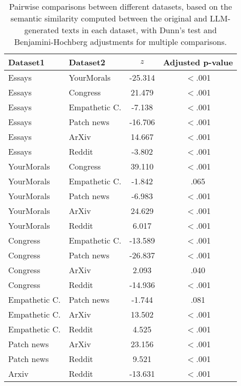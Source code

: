 \begin{table*}[h]
\caption{Pairwise comparisons between different datasets, based on the semantic similarity computed between the original and LLM-generated texts in each dataset, with Dunn's test and Benjamini-Hochberg adjustments for multiple comparisons.}
\centering
\begin{tabular}{llcc}
\toprule
Dataset1 & Dataset2 & $z$ & Adjusted p-value\\
\hline
Essays & YourMorals & -25.314 & $<$.001\\

Essays & Congress & 21.479 & $<$.001\\

Essays & Empathetic C. & -7.138 & $<$.001\\

Essays & Patch news & -16.706 & $<$.001 \\

Essays & ArXiv & 14.667 & $<$.001 \\

Essays & Reddit & -3.802 & $<$.001 \\

YourMorals & Congress & 39.110 & $<$.001 \\

YourMorals & Empathetic C. & -1.842 & .065\\

YourMorals & Patch news & -6.983 & $<$.001 \\

YourMorals & ArXiv & 24.629 & $<$.001 \\

YourMorals & Reddit & 6.017 & $<$.001 \\

Congress & Empathetic C. & -13.589 & $<$.001\\

Congress & Patch news & -26.837 & $<$.001\\

Congress & ArXiv & 2.093 & .040\\

Congress & Reddit & -14.936 & $<$.001\\

Empathetic C. & Patch news & -1.744 & .081\\

Empathetic C. & ArXiv & 13.502 & $<$.001\\

Empathetic C. & Reddit & 4.525 & $<$.001\\

Patch news & ArXiv & 23.156 & $<$.001\\

Patch news & Reddit & 9.521 & $<$.001\\

Arxiv & Reddit & -13.631 & $<$.001\\
\bottomrule
\end{tabular}
\label{tab:pairwise_sim_datasets}
\end{table*}